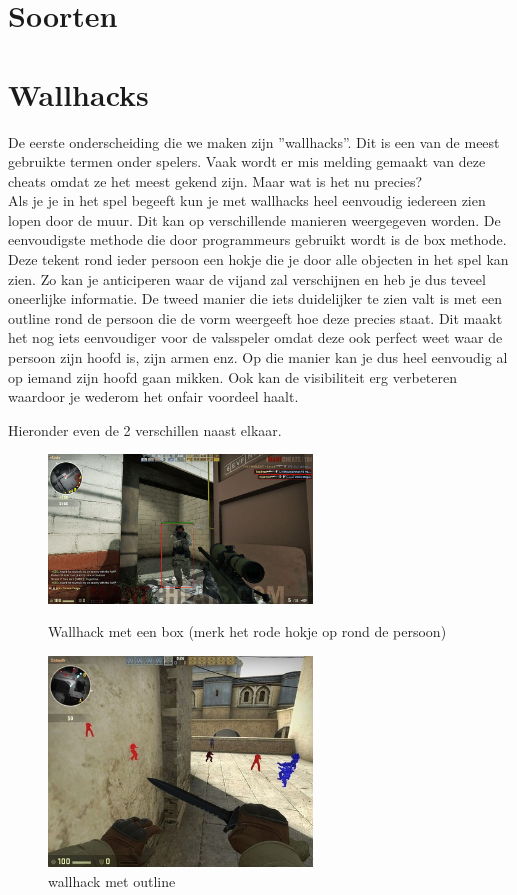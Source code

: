 \documentclass[pdftex,a4paper,12pt,twoside]{report}
\begin{document}
\section{Soorten}
\label{sec:soorten}
\section{Wallhacks}
\label{sec:walls}
De eerste onderscheiding die we maken zijn ''wallhacks''. Dit is een van de meest gebruikte termen onder spelers. Vaak wordt er mis melding gemaakt van deze cheats omdat ze het meest gekend zijn. Maar wat is het nu precies?
\\

Als je je in het spel begeeft kun je met wallhacks heel eenvoudig iedereen zien lopen door de muur. Dit kan op verschillende manieren weergegeven worden. De eenvoudigste methode die door programmeurs gebruikt wordt is de box methode. Deze tekent rond ieder persoon een hokje die je door alle objecten in het spel kan zien. Zo kan je anticiperen waar de vijand zal verschijnen en heb je dus teveel oneerlijke informatie. 
De tweed manier die iets duidelijker te zien valt is met een outline rond de persoon die de vorm weergeeft hoe deze precies staat. Dit maakt het nog iets eenvoudiger voor de valsspeler omdat deze ook perfect weet waar de persoon zijn hoofd is, zijn armen enz. Op die manier kan je dus heel eenvoudig al op iemand zijn hoofd gaan mikken. Ook kan de visibiliteit erg verbeteren waardoor je wederom het onfair voordeel haalt.

Hieronder even de 2 verschillen naast elkaar.

\begin{figure}[H]
\centering
\begin{minipage}{0.48\textwidth}
\centering
\includegraphics[width=7cm]{img/wallhack-example-box}
\caption{Wallhack met een box (merk het rode hokje op rond de persoon)}
\end{minipage}\hfill
\begin{minipage}{0.48\textwidth}
\centering
\includegraphics[width=7cm]{img/wallhack-example-outline}
\caption{wallhack met outline}
\end{minipage}
\end{figure}  
\end{document}
